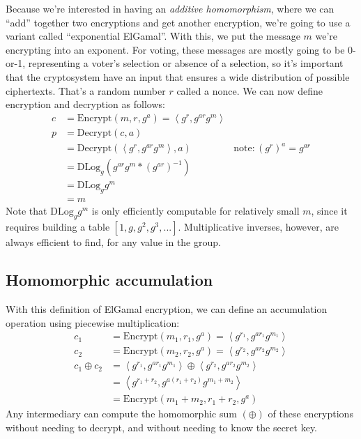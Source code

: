 Because we're interested in having an {\em additive homomorphism},
where we can ``add'' together two encryptions and get another
encryption, we're going to use a variant called ``exponential
ElGamal''. With this, we put the message $m$ we're encrypting
into an exponent. For voting, these messages are mostly going to
be 0-or-1, representing a voter's selection or absence of a selection,
so it's important that the cryptosystem have an input that ensures
a wide distribution of possible ciphertexts. That's a random number
$r$ called a nonce. We can now define encryption and decryption as
follows:
\begin{align*}
c &= \mathrm{Encrypt}(m, r, g^a) = \left<g^r, g^{ar}g^m\right> \\
p &= \mathrm{Decrypt}(c, a) \\
  &= \mathrm{Decrypt}(\left<g^r, g^{ar}g^m\right>, a) & \mathrm{note}: ({g^r})^a = g^{ar} \\
  &= \mathrm{DLog}_g\left(g^{ar}g^m * \left(g^{ar}\right)^{-1}\right) \\
  &= \mathrm{DLog}_gg^m \\
  &= m
\end{align*}
Note that $\mathrm{DLog}_gg^m$ is only efficiently computable for
relatively small $m$, since it requires building a table $\left[1, g, g^2,
g^3, ...\right]$. Multiplicative inverses, however, are always
efficient to find, for any value in the group.

\subsection{Homomorphic accumulation}
With this definition of ElGamal encryption, we can define an
accumulation operation using piecewise multiplication:
\begin{align*}
c_1 &= \mathrm{Encrypt}(m_1, r_1, g^a) = \left<g^{r_1}, g^{a{r_1}}g^{m_1}\right>\\
c_2 &= \mathrm{Encrypt}(m_2, r_2, g^a) = \left<g^{r_2}, g^{a{r_2}}g^{m_2}\right>\\
c_1 \oplus c_2 &= \left<g^{r_1}, g^{a{r_1}}g^{m_1}\right> \oplus \left<g^{r_2}, g^{a{r_2}}g^{m_2}\right>  \\
&= \left<g^{r_1 + r_2}, g^{a(r_1 + r_2)}g^{m_1 + m_2}\right>\\
&= \mathrm{Encrypt}(m_1 + m_2, r_1 + r_2, g^a)
\end{align*}
Any intermediary can compute the homomorphic sum $(\oplus)$ of these encryptions
without needing to decrypt, and without needing to know the secret
key.

